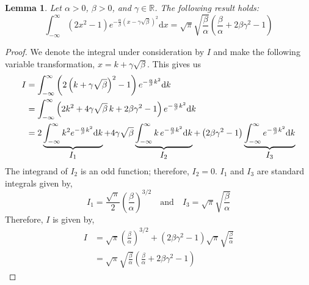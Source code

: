 \documentclass[journal]{IEEEtran}
\theoremstyle{plain}
\newtheorem{lemma}[theorem]{Lemma}
\theoremstyle{definition}
\theoremstyle{remark}
\newcommand{\R}{\mathbb{R}}
\newcommand{\dd}{\mathrm{d}}
\begin{document}
\begin{lemma} \label{lemma:I21}
Let $\alpha > 0$, $\beta > 0$, and $\gamma \in \R$. The following result holds:
\begin{equation}
    \int_{-\infty}^\infty \left(2 x^2 - 1\right) e^{ -\frac{\alpha}{\beta} (x - \gamma\sqrt{\beta})^{2}} \dd x = \sqrt{\pi} \sqrt{\frac{\beta}{\alpha}} \left(\frac{\beta}{\alpha} + 2 \beta \gamma^2 - 1 \right)
\end{equation}
\end{lemma}

\begin{proof}
We denote the integral under consideration by $I$ and make the following variable transformation, $x = k + \gamma \sqrt{\beta}$. This gives us
\begin{equation}
\begin{split}
    I &= \int_{-\infty}^\infty \left(2 \left( k + \gamma\sqrt{\beta} \right)^2 - 1\right) e^{-\frac{\alpha}{\beta} k^2} \dd k \\
    &= \int_{-\infty}^\infty \left(2 k^2 + 4 \gamma \sqrt{\beta} \, k + 2 \beta \gamma^2 - 1\right) e^{-\frac{\alpha}{\beta} k^2} \dd k \\
    &= 2 \underbrace{\int_{-\infty}^\infty k^2 e^{-\frac{\alpha}{\beta} k^2} \dd k}_{\text{\normalsize \(I_1\)}} + 4 \gamma \sqrt{\beta} \underbrace{\int_{-\infty}^\infty k \, e^{-\frac{\alpha}{\beta} k^2} \dd k}_{\text{\normalsize \(I_2\)}} + \left(2 \beta \gamma^2 - 1 \right) \underbrace{\int_{-\infty}^\infty e^{-\frac{\alpha}{\beta} k^2} \dd k}_{\text{\normalsize \(I_3\)}} 
\end{split}
\end{equation}
The integrand of $I_2$ is an odd function; therefore, $I_2=0$. $I_1$ and $I_3$ are standard integrals given by,
\begin{equation}
    I_1 = \frac{\sqrt{\pi}}{2} \left( \frac{\beta}{\alpha} \right)^{3/2} \quad \text{and} \quad I_3 = \sqrt{\pi} \sqrt{\frac{\beta}{\alpha}}
\end{equation}
Therefore, $I$ is given by,
\begin{equation}
\begin{split}
    I &= \sqrt{\pi} \left( \frac{\beta}{\alpha} \right)^{3/2} + \left(2 \beta \gamma^2 - 1 \right) \sqrt{\pi} \sqrt{\frac{\beta}{\alpha}} \\
    &= \sqrt{\pi} \sqrt{\frac{\beta}{\alpha}} \left(\frac{\beta}{\alpha} + 2 \beta \gamma^2 - 1 \right)
\end{split}
\end{equation}
\end{proof}
\end{document}
